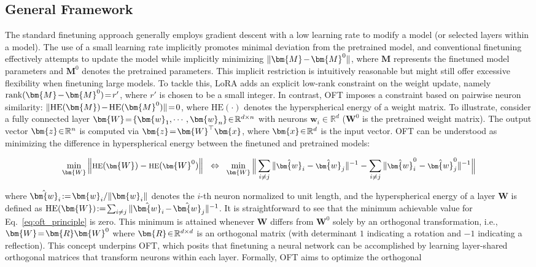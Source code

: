 \subsection{General Framework}

The standard finetuning approach generally employs gradient descent with a low learning rate to modify a model (or selected layers within a model). The use of a small learning rate implicitly promotes minimal deviation from the pretrained model, and conventional finetuning effectively attempts to update the model while implicitly minimizing $\thickmuskip=2mu \medmuskip=2mu \| \bm{M} - \bm{M}^0\|$, where $\bm{M}$ represents the finetuned model parameters and $\bm{M}^0$ denotes the pretrained parameters. This implicit restriction is intuitively reasonable but might still offer excessive flexibility when finetuning large models. To tackle this, LoRA adds an explicit low-rank constraint on the weight update, namely $\thickmuskip=2mu \medmuskip=2mu \text{rank}(\bm{M} - \bm{M}^0)=r'$, where $r'$ is chosen to be a small integer. In contrast, OFT imposes a constraint based on pairwise neuron similarity: $\thickmuskip=2mu \medmuskip=2mu \| \text{HE}(\bm{M})-\text{HE}(\bm{M}^0) \|=0$, where $\text{HE}(\cdot)$ denotes the hyperspherical energy of a weight matrix. To illustrate, consider a fully connected layer $\thickmuskip=2mu \medmuskip=2mu \bm{W}=\{\bm{w}_1,\cdots,\bm{w}_n\}\in\mathbb{R}^{d\times n}$ with neurons $\bm{w}_i\in\mathbb{R}^{d}$ ($\bm{W}^0$ is the pretrained weight matrix). The output vector $\thickmuskip=2mu \medmuskip=2mu \bm{z}\in\mathbb{R}^n$ is computed via $\thickmuskip=2mu \medmuskip=2mu \bm{z}=\bm{W}^\top\bm{x}$, where $\thickmuskip=2mu \medmuskip=2mu \bm{x}\in\mathbb{R}^d$ is the input vector. OFT can be understood as minimizing the difference in hyperspherical energy between the finetuned and pretrained models:

\begin{equation}\label{eq:oft_principle}
\footnotesize
\min_{\bm{W}} \left\| \text{HE}(\bm{W})-\text{HE}(\bm{W}^0)\right\|~~\Leftrightarrow~~\min_{\bm{W}} \bigg{\|} \sum_{i\neq j} \|\hat{\bm{w}}_i-\hat{\bm{w}}_j\|^{-1}-\sum_{i\neq j} \|\hat{\bm{w}}^0_i-\hat{\bm{w}}^0_j\|^{-1}\bigg{\|}
\end{equation}

where $\thickmuskip=2mu \medmuskip=2mu \hat{\bm{w}}_i:=\bm{w}_i/\|\bm{w}_i\|$ denotes the $i$-th neuron normalized to unit length, and the hyperspherical energy of a layer $\bm{W}$ is defined as $\thickmuskip=2mu \medmuskip=2mu \text{HE}(\bm{W}):= \sum_{i\neq j} \|\hat{\bm{w}}_i-\hat{\bm{w}}_j\|^{-1}$. It is straightforward to see that the minimum achievable value for Eq.~\eqref{eq:oft_principle} is zero. This minimum is attained whenever $\bm{W}$ differs from $\bm{W}^0$ solely by an orthogonal transformation, i.e., $\thickmuskip=2mu \medmuskip=2mu \bm{W}=\bm{R}\bm{W}^0$ where $\thickmuskip=2mu \medmuskip=2mu \bm{R}\in\mathbb{R}^{d\times d}$ is an orthogonal matrix (with determinant $1$ indicating a rotation and $-1$ indicating a reflection). This concept underpins OFT, which posits that finetuning a neural network can be accomplished by learning layer-shared orthogonal matrices that transform neurons within each layer. Formally, OFT aims to optimize the orthogonal

